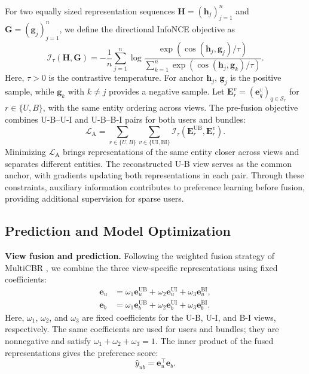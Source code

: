 \documentclass[letterpaper]{article}
\begin{document}
For two equally sized representation sequences $\mathbf H=(\mathbf h_j)_{j=1}^{n}$ and $\mathbf G=(\mathbf g_j)_{j=1}^{n}$, we define the directional InfoNCE objective \cite{oord2018cpc} as
\begin{equation}
\mathcal I_\tau(\mathbf H,\mathbf G)
=-\frac{1}{n}\sum_{j=1}^{n}
\log
\frac{\exp\!\left(\cos(\mathbf h_j,\mathbf g_j)/\tau\right)}
{\sum_{k=1}^{n}
\exp\!\left(\cos(\mathbf h_j,\mathbf g_k)/\tau\right)}.
\tag{13}
\end{equation}
Here, $\tau>0$ is the contrastive temperature. For anchor $\mathbf h_j$, $\mathbf g_j$ is the positive sample, while $\mathbf g_k$ with $k\neq j$ provides a negative sample. Let $\mathbf E_r^v=(\mathbf e_q^v)_{q\in\mathcal S_r}$ for $r\in\{U,B\}$, with the same entity ordering across views. The pre-fusion objective combines U-B--U-I and U-B--B-I pairs for both users and bundles:
\begin{equation}
\mathcal L_{\mathrm A}
=\sum_{r\in\{U,B\}}
\sum_{v\in\{\mathrm{UI},\mathrm{BI}\}}
\mathcal I_\tau\!\left(\mathbf E_r^{\mathrm{UB}},\mathbf E_r^v\right).
\tag{14}
\end{equation}
Minimizing $\mathcal L_{\mathrm A}$ brings representations of the same entity closer across views and separates different entities. The reconstructed U-B view serves as the common anchor, with gradients updating both representations in each pair. Through these constraints, auxiliary information contributes to preference learning before fusion, providing additional supervision for sparse users.

\subsection{Prediction and Model Optimization}

\textbf{View fusion and prediction.} Following the weighted fusion strategy of MultiCBR \cite{ma2024multicbr}, we combine the three view-specific representations using fixed coefficients:
\begin{equation}
\begin{aligned}
\mathbf e_u
&=\omega_1\mathbf e_u^{\mathrm{UB}}
+\omega_2\mathbf e_u^{\mathrm{UI}}
+\omega_3\mathbf e_u^{\mathrm{BI}},\\
\mathbf e_b
&=\omega_1\mathbf e_b^{\mathrm{UB}}
+\omega_2\mathbf e_b^{\mathrm{UI}}
+\omega_3\mathbf e_b^{\mathrm{BI}}.
\end{aligned}
\tag{15}
\end{equation}
Here, $\omega_1$, $\omega_2$, and $\omega_3$ are fixed coefficients for the U-B, U-I, and B-I views, respectively. The same coefficients are used for users and bundles; they are nonnegative and satisfy $\omega_1+\omega_2+\omega_3=1$. The inner product of the fused representations gives the preference score:
\begin{equation}
\hat y_{ub}=\mathbf e_u^\top\mathbf e_b.
\tag{16}
\end{equation}
\end{document}
